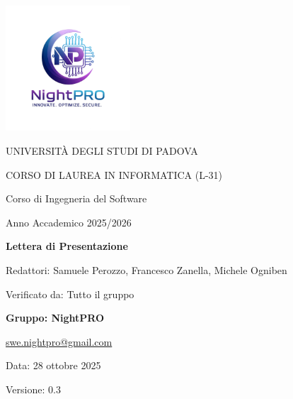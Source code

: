 \documentclass[a4paper, 11pt, oneside]{scrartcl} %
\begin{document}
\thispagestyle{empty}
\begin{titlepage}
    \centering
    \vspace*{1cm}
    \includegraphics[width=0.35\textwidth]{logo.jpg}\\[1cm]

     \vfill
    
    {\small UNIVERSITÀ DEGLI STUDI DI PADOVA \par}
    {\small CORSO DI LAUREA IN INFORMATICA (L-31) \par}
    \vspace{0.5cm}
    {\large Corso di Ingegneria del Software \par}
    {\small Anno Accademico 2025/2026 \par}
    \vfill
    
    {\Huge \bfseries Lettera di Presentazione \par}
        \vspace{1cm}
         {\Large Redattori: Samuele Perozzo, Francesco Zanella, Michele Ogniben\par} 
    {\Large Verificato da: Tutto il gruppo\par} 
    \vfill

    {\Large \bfseries Gruppo: NightPRO}    \vspace{0.5cm}

    {\large \href{mailto:swe.nightpro@gmail.com}{swe.nightpro@gmail.com}}\\[2cm]

        {\large Data: 28 ottobre 2025 \par}

     {\Large Versione: 0.3 \par} 

\end{titlepage}

\newpage
\pagestyle{fancy}
{}
\end{document}
